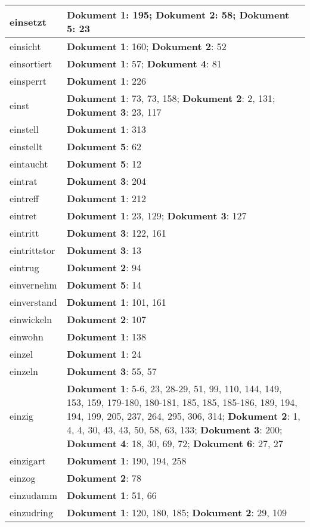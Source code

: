 \documentclass[a5paper]{article}
\begin{document}
\begin{longtable}[l]{|l|p{3in}|}
\hline
einsetzt & \textbf{Dokument 1}: 195; \textbf{Dokument 2}: 58; \textbf{Dokument 5}: 23 \\
\hline
einsicht & \textbf{Dokument 1}: 160; \textbf{Dokument 2}: 52 \\
\hline
einsortiert & \textbf{Dokument 1}: 57; \textbf{Dokument 4}: 81 \\
\hline
einsperrt & \textbf{Dokument 1}: 226 \\
\hline
einst & \textbf{Dokument 1}: 73, 73, 158; \textbf{Dokument 2}: 2, 131; \textbf{Dokument 3}: 23, 117 \\
\hline
einstell & \textbf{Dokument 1}: 313 \\
\hline
einstellt & \textbf{Dokument 5}: 62 \\
\hline
eintaucht & \textbf{Dokument 5}: 12 \\
\hline
eintrat & \textbf{Dokument 3}: 204 \\
\hline
eintreff & \textbf{Dokument 1}: 212 \\
\hline
eintret & \textbf{Dokument 1}: 23, 129; \textbf{Dokument 3}: 127 \\
\hline
eintritt & \textbf{Dokument 3}: 122, 161 \\
\hline
eintrittstor & \textbf{Dokument 3}: 13 \\
\hline
eintrug & \textbf{Dokument 2}: 94 \\
\hline
einvernehm & \textbf{Dokument 5}: 14 \\
\hline
einverstand & \textbf{Dokument 1}: 101, 161 \\
\hline
einwickeln & \textbf{Dokument 2}: 107 \\
\hline
einwohn & \textbf{Dokument 1}: 138 \\
\hline
einzel & \textbf{Dokument 1}: 24 \\
\hline
einzeln & \textbf{Dokument 3}: 55, 57 \\
\hline
einzig & \textbf{Dokument 1}: 5-6, 23, 28-29, 51, 99, 110, 144, 149, 153, 159, 179-180, 180-181, 185, 185, 185-186, 189, 194, 194, 199, 205, 237, 264, 295, 306, 314; \textbf{Dokument 2}: 1, 4, 4, 30, 43, 43, 50, 58, 63, 133; \textbf{Dokument 3}: 200; \textbf{Dokument 4}: 18, 30, 69, 72; \textbf{Dokument 6}: 27, 27 \\
\hline
einzigart & \textbf{Dokument 1}: 190, 194, 258 \\
\hline
einzog & \textbf{Dokument 2}: 78 \\
\hline
einzudamm & \textbf{Dokument 1}: 51, 66 \\
\hline
einzudring & \textbf{Dokument 1}: 120, 180, 185; \textbf{Dokument 2}: 29, 109 \\

\end{longtable}
\end{document}
